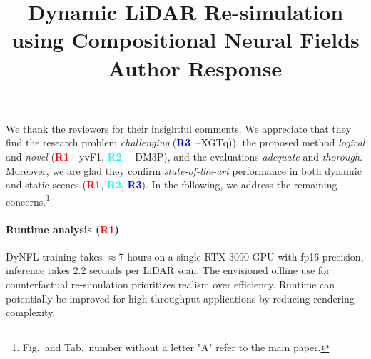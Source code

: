\documentclass[10pt,twocolumn,letterpaper]{article}
\newcommand{\ROne}{{\textcolor{red}{\textbf{R1}}}}
\newcommand{\RTwo}{{\textcolor{cyan}{\textbf{R2}}}}
\newcommand{\RThree}{{\textcolor{blue}{\textbf{R3}}}}
\begin{document}
\title{Dynamic LiDAR Re-simulation using Compositional Neural Fields -- Author Response}  %

\maketitle
\thispagestyle{empty}
\appendix

\noindent
We thank the reviewers for their insightful comments. 
We appreciate that they find the research problem \textit{challenging} (\RThree~--XGTq)), the proposed method \textit{logical} and \textit{novel} (\ROne~--yvF1, \RTwo~-- DM3P), and the evaluations \textit{adequate} and \textit{thorough}. Moreover, we are glad they confirm \textit{state-of-the-art} performance in both dynamic and static scenes (\ROne, \RTwo, \RThree). In the following, we address the remaining concerns.\footnote{Fig.\ and Tab.\ number without a letter "A" refer to the main paper.}


\paragraph{Runtime analysis (\ROne)} 
DyNFL training takes $\approx$7 hours on a single RTX 3090 GPU with fp16 precision, inference takes 2.2 seconds per LiDAR scan. The envisioned offline use for counterfactual re-simulation prioritizes realism over efficiency. Runtime can potentially be improved for high-throughput applications by reducing rendering complexity.
\end{document}
